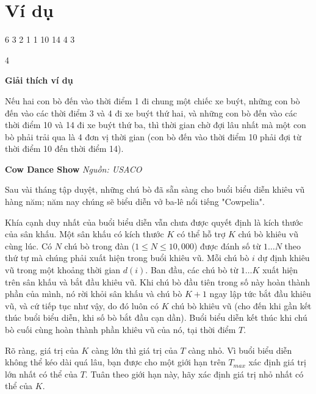 \documentclass[12pt,a4paper]{article}
\newcommand{\problem}[2]{%
  \addcontentsline{toc}{section}{#1}%
  \begin{mdframed}[
    linecolor=framecolor,
    linewidth=1.5pt,
    backgroundcolor=white,
    topline=true, bottomline=true,
    leftline=true, rightline=true,
    innerleftmargin=10pt, innerrightmargin=10pt,
    innertopmargin=6pt, innerbottommargin=6pt,
  ]
  \textbf{\large #1} \hfill \textit{Nguồn: #2}
  \end{mdframed}
  \vspace{4pt}%
}
\newcommand{\explanation}{%
  \vspace{6pt}\textbf{\textcolor{sectioncolor}{Giải thích ví dụ}}\par\vspace{2pt}%
}
\begin{document}
\section*{Ví dụ}
\begin{inputbox}
6 3 2
1 1 10 14 4 3
\end{inputbox}
\begin{outputbox}
4
\end{outputbox}

\explanation
Nếu hai con bò đến vào thời điểm 1 đi chung một chiếc xe buýt, những con bò đến vào các thời điểm 3 và 4 đi xe buýt thứ hai, và những con bò đến vào các thời điểm 10 và 14 đi xe buýt thứ ba, thì thời gian chờ đợi lâu nhất mà một con bò phải trải qua là 4 đơn vị thời gian (con bò đến vào thời điểm 10 phải đợi từ thời điểm 10 đến thời điểm 14).



\newpage







\problem{Cow Dance Show}{USACO}

Sau vài tháng tập duyệt, những chú bò đã sẵn sàng cho buổi biểu diễn khiêu vũ hàng năm; năm nay chúng sẽ biểu diễn vở ba-lê nổi tiếng "Cowpelia".

Khía cạnh duy nhất của buổi biểu diễn vẫn chưa được quyết định là kích thước của sân khấu. Một sân khấu có kích thước $K$ có thể hỗ trợ $K$ chú bò khiêu vũ cùng lúc. Có $N$ chú bò trong đàn ($1 \le N \le 10,000$) được đánh số từ $1 \dots N$ theo thứ tự mà chúng phải xuất hiện trong buổi khiêu vũ. Mỗi chú bò $i$ dự định khiêu vũ trong một khoảng thời gian $d(i)$. Ban đầu, các chú bò từ $1 \dots K$ xuất hiện trên sân khấu và bắt đầu khiêu vũ. Khi chú bò đầu tiên trong số này hoàn thành phần của mình, nó rời khỏi sân khấu và chú bò $K+1$ ngay lập tức bắt đầu khiêu vũ, và cứ tiếp tục như vậy, do đó luôn có $K$ chú bò khiêu vũ (cho đến khi gần kết thúc buổi biểu diễn, khi số bò bắt đầu cạn dần). Buổi biểu diễn kết thúc khi chú bò cuối cùng hoàn thành phần khiêu vũ của nó, tại thời điểm $T$.

Rõ ràng, giá trị của $K$ càng lớn thì giá trị của $T$ càng nhỏ. Vì buổi biểu diễn không thể kéo dài quá lâu, bạn được cho một giới hạn trên $T_{max}$ xác định giá trị lớn nhất có thể của $T$. Tuân theo giới hạn này, hãy xác định giá trị nhỏ nhất có thể của $K$.
\end{document}
